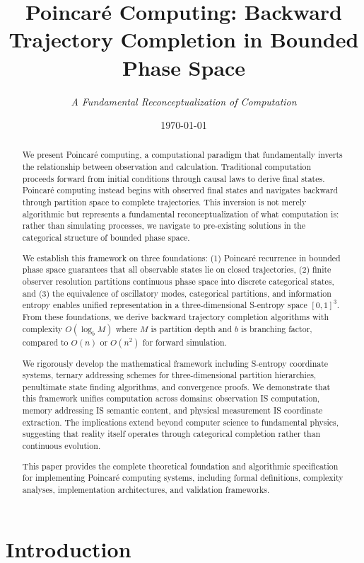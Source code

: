 \documentclass[twocolumn,10pt]{article}
\title{\textbf{Poincaré Computing: Backward Trajectory Completion in Bounded Phase Space}}
\author{
\textit{A Fundamental Reconceptualization of Computation}
}
\date{\today}
\begin{document}
\maketitle

\begin{abstract}
We present Poincaré computing, a computational paradigm that fundamentally inverts the relationship between observation and calculation. Traditional computation proceeds forward from initial conditions through causal laws to derive final states. Poincaré computing instead begins with observed final states and navigates backward through partition space to complete trajectories. This inversion is not merely algorithmic but represents a fundamental reconceptualization of what computation is: rather than simulating processes, we navigate to pre-existing solutions in the categorical structure of bounded phase space.

We establish this framework on three foundations: (1) Poincaré recurrence in bounded phase space guarantees that all observable states lie on closed trajectories, (2) finite observer resolution partitions continuous phase space into discrete categorical states, and (3) the equivalence of oscillatory modes, categorical partitions, and information entropy enables unified representation in a three-dimensional S-entropy space $[0,1]^3$. From these foundations, we derive backward trajectory completion algorithms with complexity $O(\log_b M)$ where $M$ is partition depth and $b$ is branching factor, compared to $O(n)$ or $O(n^2)$ for forward simulation.

We rigorously develop the mathematical framework including S-entropy coordinate systems, ternary addressing schemes for three-dimensional partition hierarchies, penultimate state finding algorithms, and convergence proofs. We demonstrate that this framework unifies computation across domains: observation IS computation, memory addressing IS semantic content, and physical measurement IS coordinate extraction. The implications extend beyond computer science to fundamental physics, suggesting that reality itself operates through categorical completion rather than continuous evolution.

This paper provides the complete theoretical foundation and algorithmic specification for implementing Poincaré computing systems, including formal definitions, complexity analyses, implementation architectures, and validation frameworks.
\end{abstract}

\section{Introduction}
\end{document}
